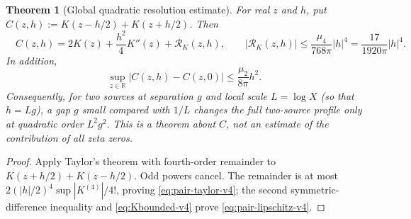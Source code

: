 \documentclass[11pt,a4paper]{article}
\numberwithin{equation}{section}
\newtheorem{theorem}{Theorem}[section]
\theoremstyle{definition}
\theoremstyle{remark}
\begin{document}
\begin{theorem}[Global quadratic resolution estimate]
\label{thm:resolution-v4}
For real $z$ and $h$, put
$C(z,h):=K(z-h/2)+K(z+h/2)$.
Then
\begin{equation}\label{eq:pair-taylor-v4}
 \boxed{\quad C(z,h)=2K(z)+\frac{h^2}{4}K''(z)
 +\mathcal R_K(z,h),\qquad
 |\mathcal R_K(z,h)|\le\frac{\mu_4}{768\pi}|h|^4
 =\frac{17}{1920\pi}|h|^4.\quad}
\end{equation}
In addition,
\begin{equation}\label{eq:pair-lipschitz-v4}
 \sup_{z\in\mathbb R}|C(z,h)-C(z,0)|
 \le\frac{\mu_2}{8\pi}h^2.
\end{equation}
Consequently, for two sources at separation $g$ and local scale $L=\log X$ (so that $h=Lg$), a gap $g$ small
compared with $1/L$ changes the full two-source profile only at
quadratic order $L^2g^2$. This is a theorem \emph{about $C$}, not an
estimate of the contribution of all zeta zeros.
\end{theorem}
\begin{proof}
Apply Taylor's theorem with fourth-order remainder to
$K(z+h/2)+K(z-h/2)$. Odd powers cancel. The remainder is
at most $2(|h|/2)^4\sup|K^{(4)}|/4!$, proving
\eqref{eq:pair-taylor-v4}; the second symmetric-difference
inequality and \eqref{eq:Kbounded-v4} prove
\eqref{eq:pair-lipschitz-v4}.
\end{proof}
\end{document}
